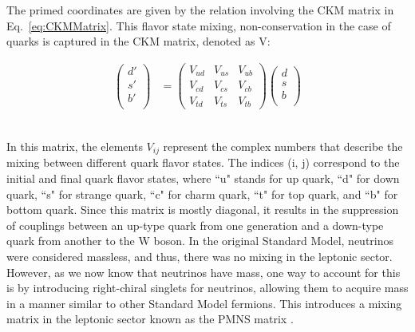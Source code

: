 The primed coordinates are given by the relation involving the CKM matrix in Eq.~\ref{eq:CKMMatrix}. This flavor state mixing, non-conservation in the case of quarks is captured in the CKM matrix, denoted as V: 

\begin{align*}
\begin{pmatrix}
d' \\
s' \\
b' \\
\end{pmatrix} &=
\begin{pmatrix}
V_{ud} & V_{us} & V_{ub} \\
V_{cd} & V_{cs} & V_{cb} \\
V_{td} & V_{ts} & V_{tb}
\end{pmatrix}
\begin{pmatrix}
d \\
s \\
b \\
\end{pmatrix}
\end{align*}~ \label{eq:CKMMatrix}


In this matrix, the elements $V_{ij}$ represent the complex numbers that describe the mixing between different quark flavor states. The indices (i, j) correspond to the initial and final quark flavor states, where ``u" stands for up quark, ``d" for down quark, ``s" for strange quark, ``c" for charm quark, ``t" for top quark, and ``b" for bottom quark. Since this matrix is mostly diagonal, it results in the suppression of couplings between an up-type quark from one generation and a down-type quark from another to the W boson. In the original Standard Model, neutrinos were considered massless, and thus, there was no mixing in the leptonic sector. However, as we now know that neutrinos have mass, one way to account for this is by introducing right-chiral singlets for neutrinos, allowing them to acquire mass in a manner similar to other Standard Model fermions. This introduces a mixing matrix in the leptonic sector known as the PMNS matrix \cite{Maki:1962mu}. 


